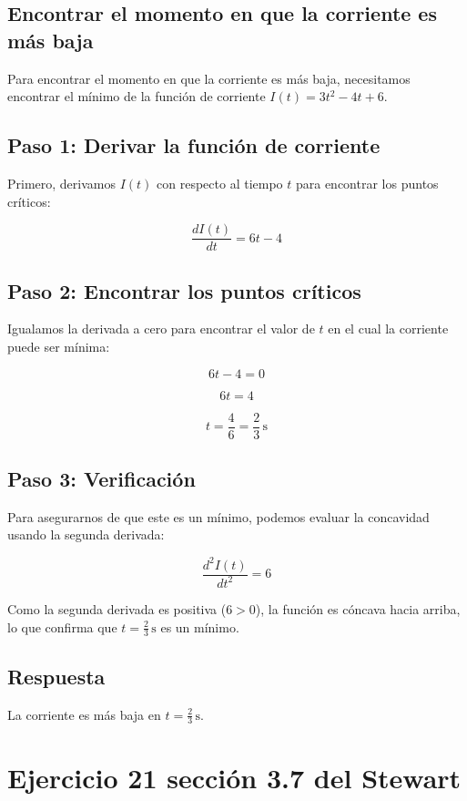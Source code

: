 \documentclass[11pt,letterpaper]{article}
\begin{document}
\subsection*{Encontrar el momento en que la corriente es más baja}

Para encontrar el momento en que la corriente es más baja, necesitamos encontrar el mínimo de la función de corriente \( I(t) = 3t^2 - 4t + 6 \).

\subsection*{Paso 1: Derivar la función de corriente}

Primero, derivamos \( I(t) \) con respecto al tiempo \( t \) para encontrar los puntos críticos:

\[
\frac{dI(t)}{dt} = 6t - 4
\]

\subsection*{Paso 2: Encontrar los puntos críticos}

Igualamos la derivada a cero para encontrar el valor de \( t \) en el cual la corriente puede ser mínima:

\[
6t - 4 = 0
\]

\[
6t = 4
\]

\[
t = \frac{4}{6} = \frac{2}{3} \, \text{s}
\]

\subsection*{Paso 3: Verificación}

Para asegurarnos de que este es un mínimo, podemos evaluar la concavidad usando la segunda derivada:

\[
\frac{d^2I(t)}{dt^2} = 6
\]

Como la segunda derivada es positiva (\( 6 > 0 \)), la función es cóncava hacia arriba, lo que confirma que \( t = \frac{2}{3} \, \text{s} \) es un mínimo.

\subsection*{Respuesta}

La corriente es más baja en \( t = \frac{2}{3} \, \text{s} \).

\section*{Ejercicio 21 sección 3.7 del Stewart}
\end{document}
